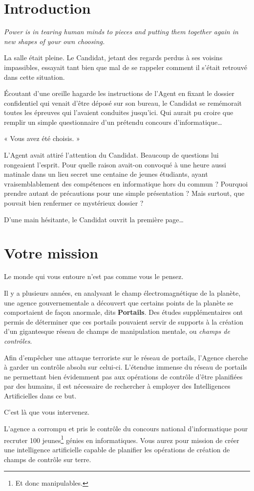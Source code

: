 \section{Introduction}

\emph{Power is in tearing human minds to pieces and putting them together again
in new shapes of your own choosing.}

\vspace{1cm}

La salle était pleine. Le Candidat, jetant des regards perdus à ses voisins
impassibles, essayait tant bien que mal de se rappeler comment il s'était
retrouvé dans cette situation.

Écoutant d'une oreille hagarde les instructions de l'Agent en fixant le dossier
confidentiel qui venait d'être déposé sur son bureau, le Candidat se remémorait
toutes les épreuves qui l'avaient conduites jusqu'ici. Qui aurait pu croire que
remplir un simple questionnaire d'un prétendu concours
d'informatique\ldots

« Vous avez été choisis. »

L'Agent avait attiré l'attention du Candidat. Beaucoup de questions lui
rongeaient l'esprit. Pour quelle raison avait-on convoqué à une heure aussi
matinale dans un lieu secret une centaine de jeunes étudiants, ayant
vraisemblablement des compétences en informatique hors du commun ? Pourquoi
prendre autant de précautions pour une simple présentation ? Mais surtout, que
pouvait bien renfermer ce mystérieux dossier ?

D'une main hésitante, le Candidat ouvrit la première page\ldots

\newpage

\section{Votre mission}

Le monde qui vous entoure n'est pas comme vous le pensez.

Il y a plusieurs années, en analysant le champ électromagnétique de la planète,
une agence gouvernementale a découvert que certains points de la planète se
comportaient de façon anormale, dits \textbf{Portails}. Des études
supplémentaires ont permis de déterminer que ces portails pouvaient servir de
supports à la création d'un gigantesque réseau de champs de manipulation
mentale, ou \emph{champs de contrôles}.

Afin d'empêcher une attaque terroriste sur le réseau de portails, l'Agence
cherche à garder un contrôle absolu sur celui-ci. L'étendue immense du réseau
de portails ne permettant bien évidemment pas aux opérations de contrôle d'être
planifiées par des humains, il est nécessaire de rechercher à employer des
Intelligences Artificielles dans ce but.

C'est là que vous intervenez.

L'agence a corrompu et pris le contrôle du concours national d'informatique
pour recruter 100 jeunes\footnote{Et donc manipulables.} génies en
informatiques. Vous aurez pour mission de créer une intelligence artificielle
capable de planifier les opérations de création de champs de contrôle sur
terre.
